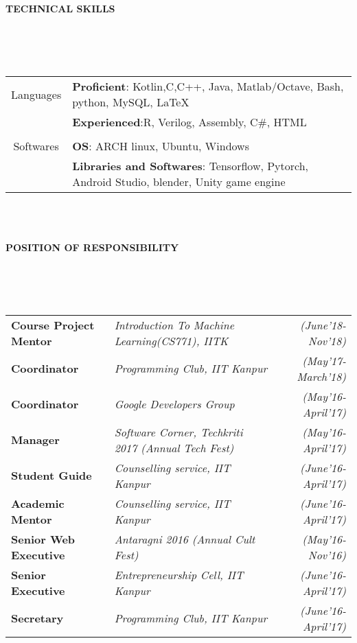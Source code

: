 \documentclass[a4paper,10pt]{article}
\newcommand{\lsep}{-0.5cm}
\newcommand{\resheading}[1]{{\small \colorbox{mygrey}{\begin{minipage}{0.975\textwidth}{\textbf{#1 \vphantom{p\^{E}}}}\end{minipage}}}}
\begin{document}
\resheading{\textbf{TECHNICAL SKILLS} }\\[\lsep]
\\ \\
\indent \begin{tabular}{c @{\hskip 0.3in}| @{\hskip 0.1in}l}
    Languages & \textbf{Proficient}: Kotlin,C,C++, Java, Matlab/Octave, Bash, python, MySQL, \LaTeX \\
     & \textbf{Experienced}:R, Verilog, Assembly, C\#, HTML\\
     \\
     Softwares & \textbf{OS}: ARCH linux, Ubuntu, Windows\\
     & \textbf{Libraries and Softwares}: Tensorflow, Pytorch, Android Studio, blender, Unity game engine
\end{tabular}\\ \\

\resheading{\textbf{POSITION OF RESPONSIBILITY} }\\[\lsep]
\\ \\ \indent
\begin{tabular}{l @{\hskip 0.5in}l @{\hskip 0.3in}r }
\textbf{Course Project Mentor} & \textit{Introduction To Machine Learning(CS771), IITK} & \emph{(June'18-Nov'18)}\\
\textbf{Coordinator} & \textit{Programming Club, IIT Kanpur} & \emph{(May'17-March'18)}\\
\textbf{Coordinator} & \textit{Google Developers Group} &
\emph{(May'16-April'17)}\\
\textbf{Manager} & \textit{Software Corner, Techkriti 2017 (Annual Tech Fest)} &
\emph{(May'16-April'17)}\\
\textbf{Student Guide} & \textit{Counselling service, IIT Kanpur} & \emph{(June'16-April'17)}\\
\textbf{Academic Mentor} & \textit{Counselling service, IIT Kanpur} & \emph{(June'16-April'17)}\\
\textbf{Senior Web Executive} & \textit{Antaragni 2016 (Annual Cult Fest)} & \emph{(May'16-Nov'16)}\\
\textbf{Senior Executive} & \textit{Entrepreneurship Cell, IIT Kanpur} & \emph{(June'16-April'17)}\\
\textbf{Secretary} & \textit{Programming Club, IIT Kanpur} & \emph{(June'16-April'17)}\\
\end{tabular}
\end{document}
